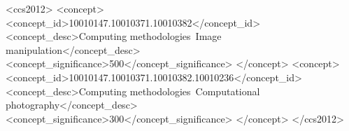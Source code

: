 \documentclass[review]{acmsiggraph}
\begin{document}
\maketitle


\linenumbers

%
%
\begin{CCSXML}
<ccs2012>
<concept>
<concept_id>10010147.10010371.10010382</concept_id>
<concept_desc>Computing methodologies~Image manipulation</concept_desc>
<concept_significance>500</concept_significance>
</concept>
<concept>
<concept_id>10010147.10010371.10010382.10010236</concept_id>
<concept_desc>Computing methodologies~Computational photography</concept_desc>
<concept_significance>300</concept_significance>
</concept>
</ccs2012>
\end{CCSXML}


\keywordlist

\conceptlist

\printcopyright











\nocite{*}



 \appendix
\end{document}
